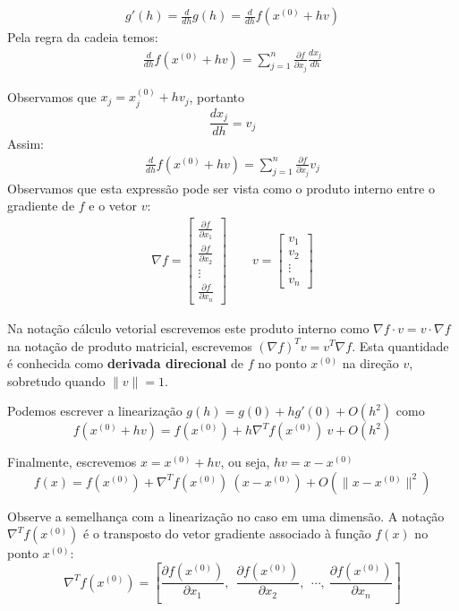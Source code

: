 \documentclass[main.tex]{subfiles}
\begin{document}
\begin{eqnarray*}
g'(h)=\frac{d}{dh}g(h)=\frac{d}{dh}f(x^{(0)}+hv)
\end{eqnarray*}
Pela regra da cadeia temos:
\begin{eqnarray*}
\frac{d}{dh}f(x^{(0)}+hv)= \sum_{j=1}^n \frac{\partial f}{\partial x_j}\frac{d x_j}{d h}
\end{eqnarray*}

Observamos que $x_j=x^{(0)}_j+hv_j$, portanto
$$\frac{d x_j}{d h}=v_j$$
Assim:
\begin{eqnarray*}
\frac{d}{dh}f(x^{(0)}+hv)= \sum_{j=1}^n \frac{\partial f}{\partial x_j}v_j
\end{eqnarray*}
Observamos que esta expressão pode ser vista como o produto interno entre o gradiente de $f$ e o vetor $v$:
\begin{eqnarray*}
\nabla f = \left[
\begin{matrix}
\frac{\partial f}{\partial x_1} \\
\frac{\partial f}{\partial x_2} \\
\vdots\\
\frac{\partial f}{\partial x_n}
\end{matrix}
\right] \qquad v=\left[
\begin{matrix}
v_1\\
v_2\\
\vdots\\
v_n
\end{matrix}
\right]
\end{eqnarray*}

Na notação cálculo vetorial escrevemos este produto interno como $\nabla f \cdot v = v \cdot \nabla f$ na notação de produto matricial, escrevemos $\left(\nabla f\right)^T v = v^T\nabla f$. Esta quantidade é conhecida como {\bf derivada direcional} de $f$ no ponto $x^{(0)}$ na direção $v$, sobretudo quando $\|v\|=1$.


Podemos escrever a linearização
$g(h)=g(0) + hg'(0) +O(h^2)$ como
$$f(x^{(0)}+hv)=f(x^{(0)})+ h \nabla^T\! f(x^{(0)})\!~v  + O(h^2)$$

Finalmente, escrevemos $x=x^{(0)}+hv$, ou seja, $hv=x-x^{(0)}$
$$f(x)=f(x^{(0)})+ \nabla^T\! f(x^{(0)})\!~(x-x^{(0)})   + O(\|x-x^{(0)}\|^2)$$

\begin{obs} Observe a semelhança com a linearização no caso em uma dimensão. A notação $\nabla^T\! f(x^{(0)})$ é o transposto do vetor gradiente associado à função $f(x)$ no ponto $x^{(0)}$:
$$\nabla^T f(x^{(0)})=\left[\frac{\partial f\left(x^{(0)}\right)}{\partial x_1},~~ \frac{\partial f\left(x^{(0)}\right)}{\partial x_2},~~ \cdots,~\frac{\partial f\left(x^{(0)}\right)}{\partial x_n}\right]$$
\end{obs}
\end{document}
